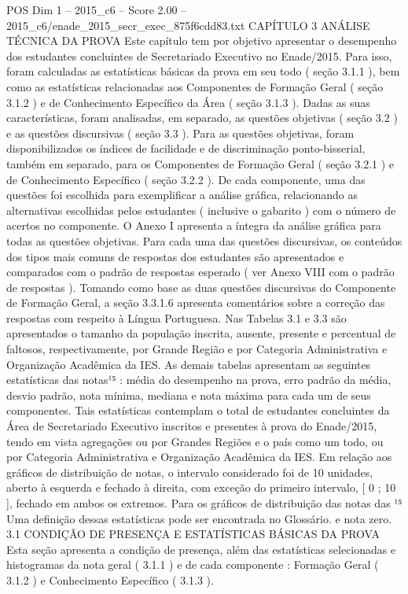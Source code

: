 \begin{textsample}{POS Dim 1 – 2015\_c6 – Score 2.00 – 2015\_c6/enade\_2015\_secr\_exec\_875f6cdd83.txt}  \label{ex:f1_pos_155}
CAPÍTULO 3 ANÁLISE TÉCNICA DA PROVA Este capítulo tem por objetivo apresentar o desempenho dos estudantes concluintes de Secretariado Executivo no Enade/2015.
Para isso, foram calculadas as estatísticas básicas da prova em seu todo ( seção 3.1.1 ), bem como as estatísticas relacionadas aos Componentes de Formação Geral ( seção 3.1.2 ) e de Conhecimento Específico da Área ( seção 3.1.3 ).
Dadas as suas características, foram analisadas, em separado, as questões objetivas ( seção 3.2 ) e as questões discursivas ( seção 3.3 ).
Para as questões objetivas, foram disponibilizados os índices de facilidade e de discriminação ponto-bisserial, também em separado, para os Componentes de Formação Geral ( seção 3.2.1 ) e de Conhecimento Específico ( seção 3.2.2 ).
De cada componente, uma das questões foi escolhida para exemplificar a análise gráfica, relacionando as alternativas escolhidas pelos estudantes ( inclusive o gabarito ) com o número de acertos no componente.
O Anexo I apresenta a íntegra da análise gráfica para todas as questões objetivas.
Para cada uma das questões discursivas, os conteúdos dos tipos mais comuns de respostas dos estudantes são apresentados e comparados com o padrão de respostas esperado ( ver Anexo VIII com o padrão de respostas ).
Tomando como base as duas questões discursivas do Componente de Formação Geral, a seção 3.3.1.6 apresenta comentários sobre a correção das respostas com respeito à Língua Portuguesa.
Nas Tabelas 3.1 e 3.3 são apresentados o tamanho da população inscrita, ausente, presente e percentual de faltosos, respectivamente, por Grande Região e por Categoria Administrativa e Organização Acadêmica da IES.
As demais tabelas apresentam as seguintes estatísticas das notas¹⁵ : média do desempenho na prova, erro padrão da média, desvio padrão, nota mínima, mediana e nota máxima para cada um de seus componentes.
Tais estatísticas contemplam o total de estudantes concluintes da Área de Secretariado Executivo inscritos e presentes à prova do Enade/2015, tendo em vista agregações ou por Grandes Regiões e o país como um todo, ou por Categoria Administrativa e Organização Acadêmica da IES.
Em relação aos gráficos de distribuição de notas, o intervalo considerado foi de 10 unidades, aberto à esquerda e fechado à direita, com exceção do primeiro intervalo, [ 0 ; 10 ], fechado em ambos os extremos.
Para os gráficos de distribuição das notas das ¹⁵ Uma definição dessas estatísticas pode ser encontrada no Glossário. e nota zero. 3.1 CONDIÇÃO DE PRESENÇA E ESTATÍSTICAS BÁSICAS DA PROVA Esta seção apresenta a condição de presença, além das estatísticas selecionadas e histogramas da nota geral ( 3.1.1 ) e de cada componente : Formação Geral ( 3.1.2 ) e Conhecimento Específico ( 3.1.3 ).

\end{textsample}
